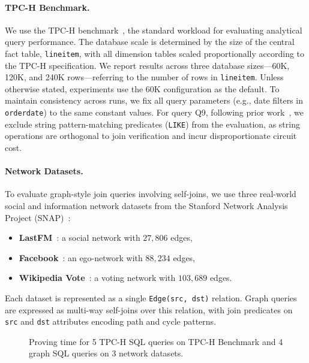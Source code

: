 \documentclass[sigconf]{acmart}
\begin{document}
\paragraph{TPC-H Benchmark.}
We use the TPC-H benchmark~\cite{TPC-H2023}, the standard workload for evaluating analytical query performance. The database scale is determined by the size of the central fact table, \texttt{lineitem}, with all dimension tables scaled proportionally according to the TPC-H specification. We report results across three database sizes---60K, 120K, and 240K rows---referring to the number of rows in \texttt{lineitem}. Unless otherwise stated, experiments use the 60K configuration as the default. To maintain consistency across runs, we fix all query parameters (e.g., date filters in \texttt{orderdate}) to the same constant values. For query Q9, following prior work~\cite{li2023zksql}, we exclude string pattern-matching predicates (\texttt{LIKE}) from the evaluation, as string operations are orthogonal to join verification and incur disproportionate circuit cost.

\paragraph{Network Datasets.}
To evaluate graph-style join queries involving self-joins, we use three real-world social and information network datasets from the Stanford Network Analysis Project (SNAP)~\cite{snapnets}:
\begin{itemize}[leftmargin=*, itemsep=0.1em]
    \item \textbf{LastFM}~\cite{snap_lastfm}: a social network with $27{,}806$ edges,
    \item \textbf{Facebook}~\cite{snap_facebook}: an ego-network with $88{,}234$ edges,
    \item \textbf{Wikipedia Vote}~\cite{snap_wikivote}: a voting network with $103{,}689$ edges.
\end{itemize}
Each dataset is represented as a single \texttt{Edge(src, dst)} relation. Graph queries are expressed as multi-way self-joins over this relation, with join predicates on \texttt{src} and \texttt{dst} attributes encoding path and cycle patterns.


\begin{figure}
\centerline{ }
\captionsetup{skip=2pt} 
\caption{Proving time for 5
TPC-H SQL queries on TPC-H Benchmark and 4 graph SQL queries on 3 network datasets.}
\label{fig:proving_time}
\vspace{-0.2in}
\end{figure}
\end{document}

